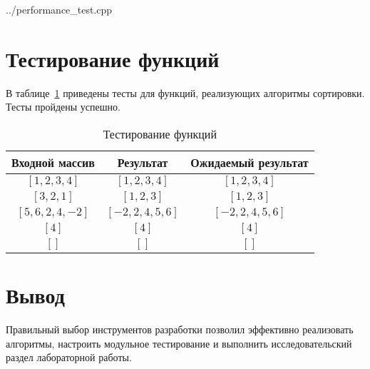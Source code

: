\begin{lstinputlisting}[
	caption={Функция замера времени работы алгоритмов},
	label={lst:count_time},
	style={cpp},
	linerange={39-54}
]{../performance_test.cpp}
\end{lstinputlisting}

\section{Тестирование функций}

В таблице~\ref{tbl:test} приведены тесты для функций, реализующих алгоритмы сортировки. Тесты пройдены успешно.

\begin{table}[h!]
	\begin{center}
		\begin{tabular}{|c|c|c|}
			\hline
			Входной массив & Результат & Ожидаемый результат \\ 
			\hline
			$[1,2,3,4]$ & $[1,2,3,4]$  & $[1,2,3,4]$\\
			$[3,2,1]$  & $[1,2,3]$ & $[1,2,3]$\\
			$[5,6,2,4,-2]$  & $[-2,2,4,5,6]$  & $[-2,2,4,5,6]$\\
			$[4]$  & $[4]$  & $[4]$\\
			$[]$  & $[]$  & $[]$\\
			\hline
		\end{tabular}
		\caption{\label{tbl:test}Тестирование функций}
	\end{center}
\end{table}

\section*{Вывод}

Правильный выбор инструментов разработки позволил эффективно реализовать алгоритмы, настроить модульное тестирование и выполнить исследовательский раздел лабораторной работы.
